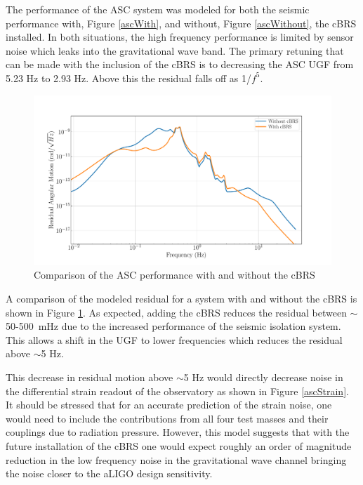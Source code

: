 \documentclass [12pt, proquest]{uwthesis}[2019]
\begin{document}
The performance of the ASC system was modeled for both the seismic performance with, Figure \ref{ascWith}, and without, Figure \ref{ascWithout}, the cBRS installed. In both situations, the high frequency performance is limited by sensor noise which leaks into the gravitational wave band. The primary retuning that can be made with the inclusion of the cBRS is to decreasing the ASC UGF from 5.23 Hz to 2.93 Hz. Above this the residual falls off as 1/$f^5$.

\begin{figure}[!h]
\begin{center}
\includegraphics[width=\textwidth]{cBRS_ASC_LowF.pdf}
\caption[Comparison of the ASC performance with and without the cBRS]{Comparison of the ASC performance with and without the cBRS}
\label{ascComp}
\end{center}
\end{figure}

A comparison of the modeled residual for a system with and without the cBRS is shown in Figure \ref{ascComp}. As expected, adding the cBRS reduces the residual between $\sim$50-500~mHz due to the increased performance of the seismic isolation system. This allows a shift in the UGF to lower frequencies which reduces the residual above $\sim$5 Hz. 

This decrease in residual motion above $\sim$5 Hz would directly decrease noise in the differential strain readout of the observatory as shown in Figure \ref{ascStrain}. It should be stressed that for an accurate prediction of the strain noise, one would need to include the contributions from all four test masses and their couplings due to radiation pressure. However, this model suggests that with the future installation of the cBRS one would expect roughly an order of magnitude reduction in the low frequency noise in the gravitational wave channel bringing the noise closer to the aLIGO design sensitivity.
\end{document}
